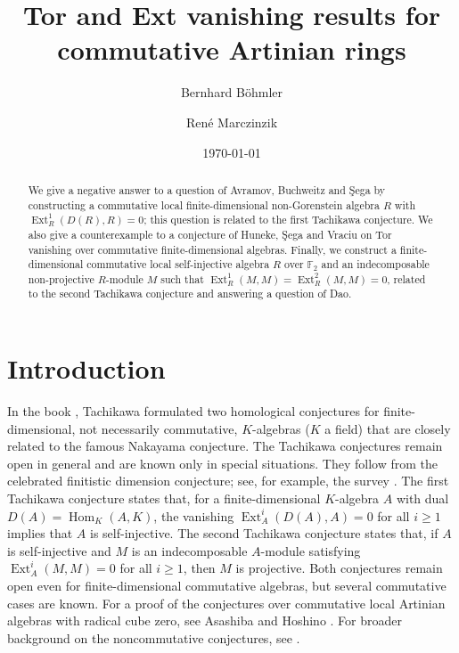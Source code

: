 \documentclass[a4paper]{amsart}
\theoremstyle{definition}
\theoremstyle{remark}
\numberwithin{equation}{section}
\newcommand{\Ext}{\operatorname{Ext}}
\newcommand{\Hom}{\operatorname{Hom}}
\begin{document}
\title{Tor and Ext vanishing results for commutative Artinian rings}
\date{\today}



\author{Bernhard B\"ohmler}
\address[B.~B\"ohmler]{Leibniz Universit\"at Hannover, Institut f\"ur Algebra, Zahlentheorie und Diskrete Mathematik, Welfengarten 1, 30167 Hannover, Germany}

\author{Ren\'{e} Marczinzik}
\address[R.~Marczinzik]{Mathematical Institute of the University of Bonn, Endenicher Allee 60, 53115 Bonn, Germany}

\begin{abstract}
We give a negative answer to a question of Avramov, Buchweitz and \c{S}ega by constructing a commutative local finite-dimensional non-Gorenstein algebra $R$ with $\Ext_R^1(D(R),R)=0$; this question is related to the first Tachikawa conjecture. We also give a counterexample to a conjecture of Huneke, \c{S}ega and Vraciu on Tor vanishing over commutative finite-dimensional algebras. Finally, we construct a finite-dimensional commutative local self-injective algebra $R$ over $\mathbb{F}_2$ and an indecomposable non-projective $R$-module $M$ such that $\Ext_R^1(M,M)=\Ext_R^2(M,M)=0$, related to the second Tachikawa conjecture and answering a question of Dao.
\end{abstract}

\maketitle

\section*{Introduction}
In the book \cite{Ta}, Tachikawa formulated two homological conjectures for finite-dimensional, not necessarily commutative, $K$-algebras ($K$ a field) that are closely related to the famous Nakayama conjecture.
The Tachikawa conjectures remain open in general and are known only in special situations. They follow from the celebrated finitistic dimension conjecture; see, for example, the survey \cite{Y}.
The first Tachikawa conjecture states that, for a finite-dimensional $K$-algebra $A$ with dual $D(A)=\Hom_K(A,K)$, the vanishing $\Ext_A^i(D(A),A)=0$ for all $i\geq1$ implies that $A$ is self-injective. The second Tachikawa conjecture states that, if $A$ is self-injective and $M$ is an indecomposable $A$-module satisfying $\Ext_A^i(M,M)=0$ for all $i\geq1$, then $M$ is projective.
Both conjectures remain open even for finite-dimensional commutative algebras, but several commutative cases are known. For a proof of the conjectures over commutative local Artinian algebras with radical cube zero, see Asashiba and Hoshino \cite{A,H,H2}. For broader background on the noncommutative conjectures, see \cite{CFX,Sa}.
\end{document}
